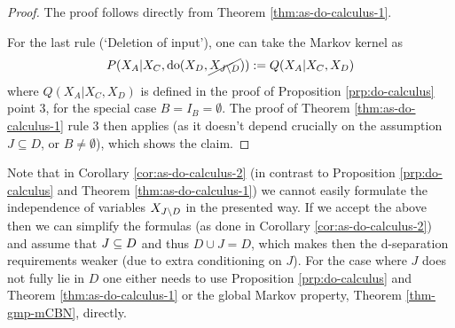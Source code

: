 \begin{proof}
The proof follows directly from Theorem \ref{thm:as-do-calculus-1}.

For the last rule (`Deletion of input'), one can take the Markov kernel as
$$P(X_A|X_C,\operatorname{do}(X_{D},\cancel{X_{J\setminus D}})) := Q(X_A|X_C,X_D)$$
where $Q(X_A|X_C,X_D)$ is defined in the proof of Proposition \ref{prp:do-calculus} point 3, for the special case $B = I_B = \emptyset$.
The proof of Theorem \ref{thm:as-do-calculus-1} rule 3 then applies (as it doesn't depend crucially on the assumption $J \subseteq D$, or $B \ne \emptyset$), which shows the claim.
\end{proof}


\begin{Rem}
Note that in Corollary \ref{cor:as-do-calculus-2} (in contrast to Proposition \ref{prp:do-calculus} and Theorem \ref{thm:as-do-calculus-1})  we cannot easily formulate the independence of variables $X_{J \setminus D}$ in the presented way. 
 If we accept the above then we can simplify the formulas (as done in Corollary \ref{cor:as-do-calculus-2}) and assume that $J \subseteq D$ and thus $D \cup J = D$, which makes then the d-separation requirements weaker (due to extra conditioning on $J$). 
For the case where $J$ does not fully lie in $D$ one either needs to use Proposition \ref{prp:do-calculus} and Theorem \ref{thm:as-do-calculus-1} or the global Markov property, Theorem \ref{thm-gmp-mCBN}, directly. 
\end{Rem}
